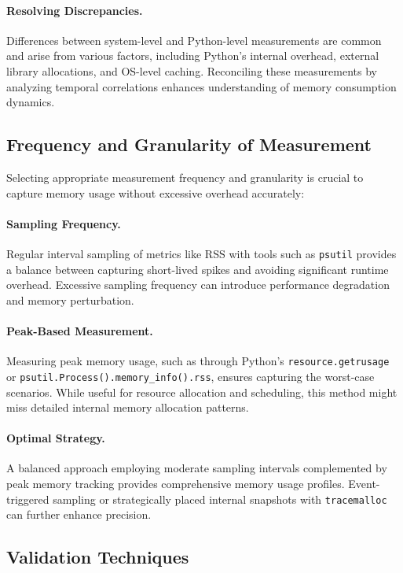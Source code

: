 \paragraph{Resolving Discrepancies.}
Differences between system-level and Python-level measurements are common and arise from various factors, including Python's internal overhead, external library allocations, and \ac{OS}-level caching.
Reconciling these measurements by analyzing temporal correlations enhances understanding of memory consumption dynamics.

\subsection{Frequency and Granularity of Measurement}
\label{subsec:mmc-bestpractices-frequency-granularity}

Selecting appropriate measurement frequency and granularity is crucial to capture memory usage without excessive overhead accurately:

\paragraph{Sampling Frequency.}
Regular interval sampling of metrics like \ac{RSS} with tools such as \texttt{psutil} provides a balance between capturing short-lived spikes and avoiding significant runtime overhead.
Excessive sampling frequency can introduce performance degradation and memory perturbation.

\paragraph{Peak-Based Measurement.}
Measuring peak memory usage, such as through Python's \texttt{resource.getrusage} or \texttt{psutil.Process().memory\_info().rss}, ensures capturing the worst-case scenarios.
While useful for resource allocation and scheduling, this method might miss detailed internal memory allocation patterns.

\paragraph{Optimal Strategy.}
A balanced approach employing moderate sampling intervals complemented by peak memory tracking provides comprehensive memory usage profiles.
Event-triggered sampling or strategically placed internal snapshots with \texttt{tracemalloc} can further enhance precision.

\subsection{Validation Techniques}
\label{subsec:mmc-bestpractices-validation}

